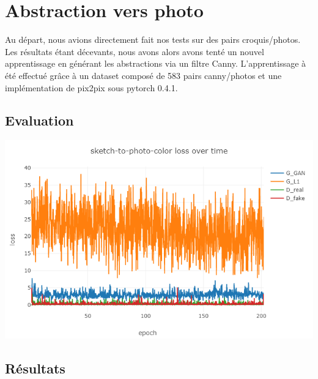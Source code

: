 \documentclass[a4paper, 12pt]{report}
\begin{document}
\pagebreak

\section{Abstraction vers photo}

Au départ, nous avions directement fait nos tests sur des pairs croquis/photos. Les résultats étant décevants, nous avons alors avons tenté un nouvel apprentissage en générant les abstractions via un filtre Canny. L'apprentissage à été effectué grâce à un dataset composé de 583 pairs canny/photos et une implémentation de pix2pix sous pytorch 0.4.1.

\subsection{Evaluation}
\begin{center}
  \centering
    \includegraphics[width=0.9\linewidth]{images/plot-pix2pix.png}
\end{center}

\subsection{Résultats}

\vspace*{\baselineskip}
\end{document}
